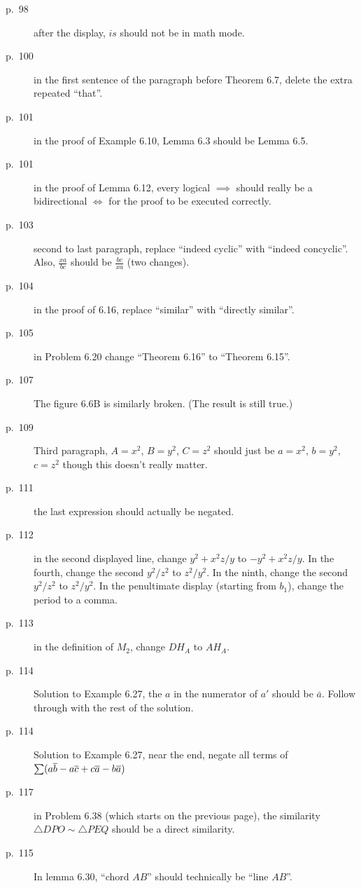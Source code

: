 \documentclass[11pt]{scrartcl}
\begin{document}
\begin{description}
\item[p.\  98] after the display, $is$ should not be in math mode.
\item[p.\  100] in the first sentence of the paragraph before Theorem 6.7,
  delete the extra repeated ``that''.
\item[p.\  101] in the proof of Example 6.10, Lemma 6.3 should be Lemma 6.5.
\item[p.\  101] in the proof of Lemma 6.12, every logical $\implies$ should
  really be a bidirectional $\iff$ for the proof to be executed correctly.
\item[p.\  103] second to last paragraph, replace ``indeed cyclic'' with ``indeed concyclic''.
  Also, $\frac{xa}{bc}$ should be $\frac{bc}{xa}$ (two changes).
\item[p.\  104] in the proof of 6.16, replace ``similar'' with ``directly similar''.
\item[p.\  105] in Problem 6.20 change ``Theorem 6.16'' to ``Theorem 6.15''.
\item[p.\  107] 
  The figure 6.6B is similarly broken.
  (The result is still true.)
\item[p.\  109] Third paragraph, $A=x^2$, $B=y^2$, $C=z^2$
  should just be $a=x^2$, $b=y^2$, $c=z^2$ though this doesn't really matter.
\item[p.\  111] the last expression should actually be negated.
\item[p.\  112] in the second displayed line, change $y^2+x^2z/y$ to $-y^2+x^2z/y$.
  In the fourth, change the second $y^2/z^2$ to $z^2/y^2$.
  In the ninth, change the second $y^2/z^2$ to $z^2/y^2$.
  In the penultimate display (starting from $b_1$), change the period to a comma.
\item[p.\  113] in the definition of $M_2$, change $DH_A$ to $AH_A$.
\item[p.\  114] Solution to Example 6.27, the $a$ in the numerator of $a'$ should be $\bar a$.
  Follow through with the rest of the solution.
\item[p.\  114] Solution to Example 6.27, near the end, negate all terms of
  $\sum (a \overline b - a \overline c + c \overline a - b \overline a)$
\item[p.\  117] in Problem 6.38 (which starts on the previous page), the similarity
  $\triangle DPO \sim \triangle PEQ$ should be a direct similarity.
\item[p.\  115] In lemma 6.30, ``chord $AB$'' should technically be ``line $AB$''.

\end{description}
\end{document}
